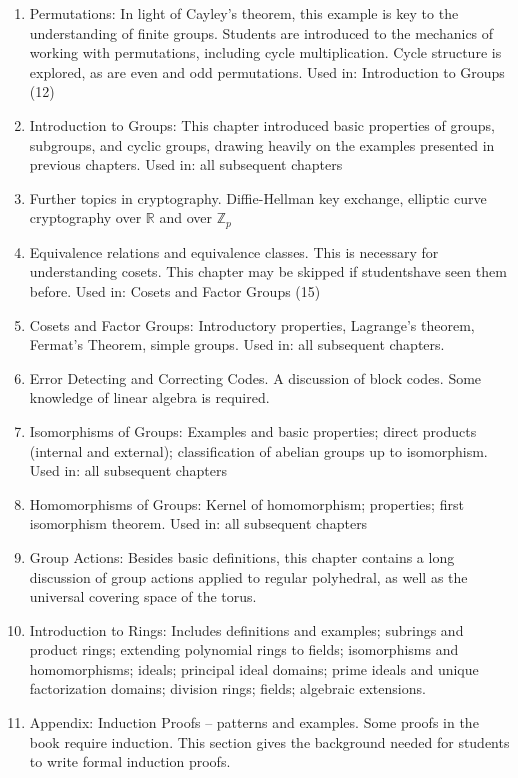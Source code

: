 \begin{enumerate}
\item
Permutations: In light of Cayley's theorem, this example is key to the understanding of finite groups. Students are introduced to the mechanics of working with permutations, including cycle multiplication. Cycle structure is explored, as are even and odd permutations. Used in:  Introduction to Groups (12)
\item
Introduction to Groups: This chapter introduced basic properties of groups, subgroups, and cyclic groups, drawing heavily on the examples presented in previous chapters. Used in:  all subsequent chapters
\item
Further topics in cryptography.  Diffie-Hellman key exchange, elliptic curve cryptography over ${\mathbb R}$ and over ${\mathbb Z}_p$
\item
Equivalence relations and equivalence classes. This is necessary for understanding cosets. This chapter may be skipped if studentshave seen them before.  Used in:  Cosets and Factor Groups (15)
\item
Cosets and Factor Groups: Introductory properties, Lagrange's theorem, Fermat's Theorem, simple groups.  Used in: all subsequent chapters.
\item
Error Detecting and Correcting Codes. A discussion of block codes. Some knowledge of linear algebra is required.
\item
Isomorphisms of Groups: Examples and basic properties; direct products (internal and external); classification of abelian groups up to isomorphism. Used in: all subsequent chapters
\item
Homomorphisms of Groups: Kernel of homomorphism; properties; first isomorphism theorem.  Used in: all subsequent chapters
\item
Group Actions: Besides basic definitions, this chapter contains a long discussion of group actions applied to regular polyhedral, as well as the universal covering space of the torus.
\item
Introduction to Rings:  Includes definitions and examples; subrings and product rings; extending polynomial rings to fields;  isomorphisms and homomorphisms; ideals; principal ideal domains; prime ideals and unique factorization domains; division rings; fields;  algebraic extensions. 
\item
Appendix: Induction Proofs -- patterns and examples.  Some proofs in the book require induction. This section gives the background needed for students to write formal induction proofs. 
\end{enumerate}

